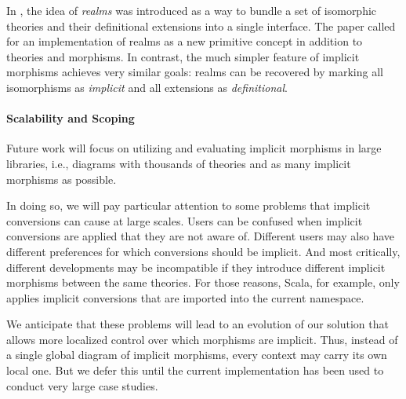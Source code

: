 In \cite{realms}, the idea of \emph{realms} was introduced as a way to bundle a set of isomorphic theories and their definitional extensions into a single interface.
The paper called for an implementation of realms as a new primitive concept in addition to theories and morphisms.
In contrast, the much simpler feature of implicit morphisms achieves very similar goals: realms can be recovered by marking all isomorphisms as \emph{implicit} and all extensions as \emph{definitional}.

%

\paragraph{Scalability and Scoping}
Future work will focus on utilizing and evaluating implicit morphisms in large libraries, i.e., diagrams with thousands of theories and as many implicit morphisms as possible.

In doing so, we will pay particular attention to some problems that implicit conversions can cause at large scales.
Users can be confused when implicit conversions are applied that they are not aware of.
Different users may also have different preferences for which conversions should be implicit.
And most critically, different developments may be incompatible if they introduce different implicit morphisms between the same theories.
For those reasons, Scala, for example, only applies implicit conversions that are imported into the current namespace.

We anticipate that these problems will lead to an evolution of our solution that allows more localized control over which morphisms are implicit.
Thus, instead of a single global diagram of implicit morphisms, every context may carry its own local one.
But we defer this until the current implementation has been used to conduct very large case studies.


